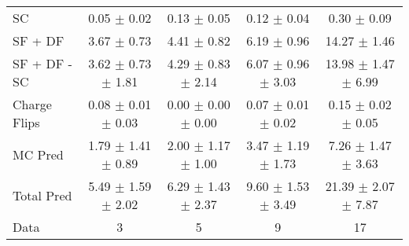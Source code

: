 \begin{tabular}{l|cccc}
                                 SC &  0.05 $\pm$  0.02 &  0.13 $\pm$  0.05 &  0.12 $\pm$  0.04 &  0.30 $\pm$  0.09 \\
                            SF + DF &  3.67 $\pm$  0.73 &  4.41 $\pm$  0.82 &  6.19 $\pm$  0.96 & 14.27 $\pm$  1.46 \\
\hline
                       SF + DF - SC &  3.62 $\pm$  0.73 $\pm$  1.81 &  4.29 $\pm$  0.83 $\pm$  2.14 &  6.07 $\pm$  0.96 $\pm$  3.03 & 13.98 $\pm$  1.47 $\pm$  6.99 \\
\hline\hline
                       Charge Flips &  0.08 $\pm$  0.01 $\pm$  0.03 &  0.00 $\pm$  0.00 $\pm$  0.00 &  0.07 $\pm$  0.01 $\pm$  0.02 &  0.15 $\pm$  0.02 $\pm$  0.05 \\
\hline
                            MC Pred &  1.79 $\pm$  1.41 $\pm$  0.89 &  2.00 $\pm$  1.17 $\pm$  1.00 &  3.47 $\pm$  1.19 $\pm$  1.73 &  7.26 $\pm$  1.47 $\pm$  3.63 \\
\hline
                         Total Pred &  5.49 $\pm$  1.59 $\pm$  2.02 &  6.29 $\pm$  1.43 $\pm$  2.37 &  9.60 $\pm$  1.53 $\pm$  3.49 & 21.39 $\pm$  2.07 $\pm$  7.87 \\
\hline\hline
                               Data &     3 &     5 &     9 &    17 \\
\hline\hline
\end{tabular}

